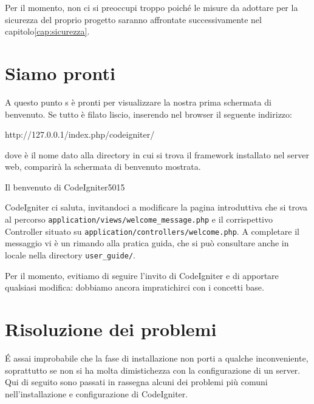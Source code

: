 Per il momento, non ci si preoccupi troppo poiché le misure da adottare per la sicurezza del proprio progetto saranno affrontate successivamente nel capitolo\vref{cap:sicurezza}.

\section{Siamo pronti}
A questo punto s è pronti per visualizzare la nostra prima schermata di benvenuto. Se tutto è filato liscio, inserendo nel browser il seguente indirizzo:

\begin{code}
http://127.0.0.1/index.php/codeigniter/
\end{code}

dove  è il nome dato alla directory in cui si trova il framework installato nel server web, comparirà la schermata di benvenuto mostrata.

\begin{img}{Il benvenuto di CodeIgniter}{5}{015}
\end{img}

\label{sec:welcome}
CodeIgniter ci saluta, invitandoci a modificare la pagina introduttiva  che si trova al percorso \verb|application/views/welcome_message.php| e il corrispettivo Controller situato su \verb|application/controllers/welcome.php|. A completare il messaggio vi è un rimando alla pratica guida, che si può consultare anche in locale nella directory \verb|user_guide/|. 

Per il momento, evitiamo di seguire l'invito di CodeIgniter e di apportare qualsiasi modifica: dobbiamo ancora impratichirci con i concetti base.

\label{sec:problemi}
\section{Risoluzione dei problemi}
\'E assai improbabile che la fase di installazione non porti a qualche inconveniente, soprattutto se non si ha molta dimistichezza con la configurazione di un server. Qui di seguito sono passati in rassegna alcuni dei problemi più comuni nell'installazione e configurazione di CodeIgniter.

